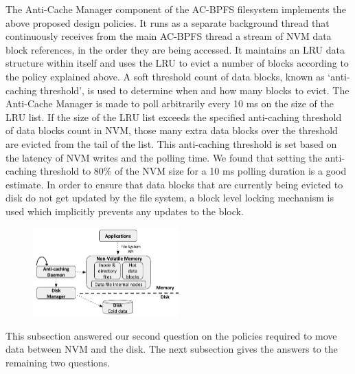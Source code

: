 The Anti-Cache Manager component of the AC-BPFS filesystem implements the above proposed design policies. It runs as a separate background thread that continuously receives from the main AC-BPFS thread a stream of NVM data block references, in the order they are being accessed. It maintains an LRU data structure within itself and uses the LRU to evict a number of blocks according to the policy explained above. A soft threshold count of data blocks, known as `anti-caching threshold', is used to determine when and how many blocks to evict. The Anti-Cache Manager is made to poll arbitrarily every 10 ms on the size of the LRU list. If the size of the LRU list exceeds the specified anti-caching threshold of data blocks count in NVM, those many extra data blocks over the threshold are evicted from the tail of the list. This anti-caching threshold is set based on the latency of NVM writes and the polling time. We found that setting the anti-caching threshold to 80\% of the NVM size for a 10 ms polling duration is a good estimate. In order to ensure that data blocks that are currently being evicted to disk do not get updated by the file system, a block level locking mechanism is used which implicitly prevents any updates to the block.

\begin{figure}
\centering
\vspace{-0.2in}
\includegraphics[width=0.5\textwidth]{figs/bpfs.pdf}
\vspace{-0.2in}
\end{figure}

This subsection answered our second question on the policies required to move data between NVM and the disk. The next subsection gives the answers to the remaining two questions.

